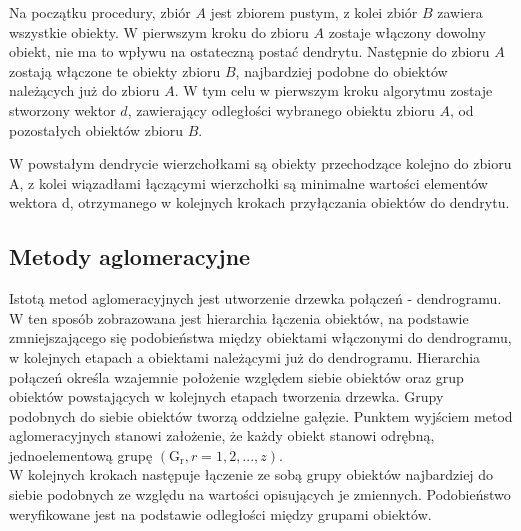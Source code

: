 \documentclass[12pt,a4paper]{report}
\begin{document}
Na początku procedury, zbiór $A$ jest zbiorem pustym, z kolei zbiór $B$ zawiera wszystkie obiekty. W pierwszym kroku do zbioru $A$ zostaje włączony dowolny obiekt, nie ma to wpływu na ostateczną postać dendrytu. Następnie do zbioru $A$ zostają włączone te obiekty zbioru $B$, najbardziej podobne do obiektów należących już do zbioru $A$. W tym celu w pierwszym kroku algorytmu zostaje stworzony wektor $d$, zawierający odległości wybranego obiektu zbioru $A$, od pozostałych obiektów zbioru $B$.


W powstałym dendrycie wierzchołkami są obiekty przechodzące kolejno do zbioru A, z kolei wiązadłami łączącymi wierzchołki są minimalne wartości elementów wektora d, otrzymanego w kolejnych krokach przyłączania obiektów do dendrytu. 

\subsection{Metody aglomeracyjne}
\noindent
Istotą metod aglomeracyjnych jest utworzenie drzewka połączeń - dendrogramu. W ten sposób zobrazowana jest hierarchia łączenia obiektów, na podstawie zmniejszającego się podobieństwa między obiektami włączonymi do dendrogramu, w kolejnych etapach a obiektami należącymi już do dendrogramu. Hierarchia połączeń określa wzajemnie położenie względem siebie obiektów oraz grup obiektów powstających w kolejnych etapach tworzenia drzewka. Grupy podobnych do siebie obiektów tworzą oddzielne gałęzie.  
Punktem wyjściem metod aglomeracyjnych stanowi założenie, że każdy obiekt stanowi odrębną, jednoelementową grupę $(\mathrm{G_{r}}, r=1,2,...,z)$.\\
W kolejnych krokach następuje łączenie ze sobą grupy obiektów najbardziej do siebie podobnych ze względu na wartości opisujących je zmiennych. Podobieństwo weryfikowane jest na podstawie odległości między grupami obiektów. %
\end{document}
